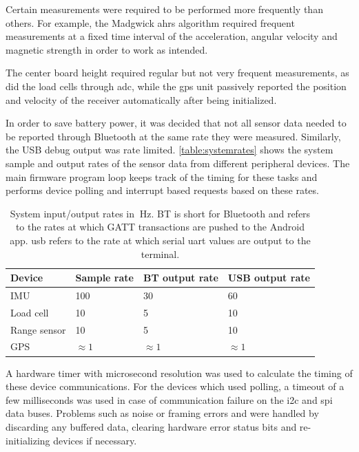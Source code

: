 Certain measurements were required to be performed more frequently than others. For example, the Madgwick \gls{ahrs} algorithm required frequent measurements at a fixed time interval of the acceleration, angular velocity and magnetic strength in order to work as intended.

The center board height required regular but not very frequent measurements, as did the load cells through \gls{adc}, while the \gls{gps} unit passively reported the position and velocity of the receiver automatically after being initialized.

In order to save battery power, it was decided that not all sensor data needed to be reported through Bluetooth at the same rate they were measured. Similarly, the USB debug output was rate limited. \autoref{table:systemrates} shows the system sample and output rates of the sensor data from different peripheral devices. The main firmware program loop keeps track of the timing for these tasks and performs device polling and interrupt based requests based on these rates.

\begin{table}[H]
\centering
\begin{tabular}{ l | l | l | l }
  Device 	& Sample rate & BT output rate 	& USB output rate\\
  \hline
  IMU 		& 100 		& 30 			& 60\\
  Load cell 	& 10 		& 5 			& 10\\
  Range sensor & 10 	& 5 			& 10\\
  GPS 		& $\approx 1$ & $\approx 1$ 	& $\approx 1$\\
\end{tabular}
\caption{System input/output rates in $~\textrm{Hz}$. BT is short for Bluetooth and refers to the rates at which GATT transactions are pushed to the Android app. \gls{usb} refers to the rate at which serial \gls{uart} values are output to the terminal.}
\label{table:systemrates}
\end{table}

A hardware timer with microsecond resolution was used to calculate the timing of these device communications. For the devices which used polling, a timeout of a few milliseconds was used in case of communication failure on the \gls{i2c} and \gls{spi} data buses. Problems such as noise or framing errors and were handled by discarding any buffered data, clearing hardware error status bits and re-initializing devices if necessary.
